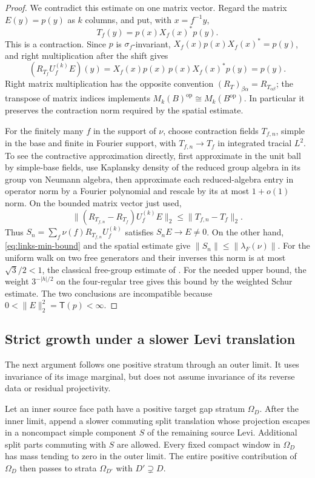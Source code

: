 \begin{proof}
We contradict this estimate on one matrix vector. Regard the matrix
\(E(y)=p(y)\) as \(k\) columns, and put, with \(x=f^{-1}y\),
\[
 T_f(y)=p(x)X_f(x)^*p(y).
\]
This is a contraction. Since \(p\) is \(\sigma_f\)-invariant,
\(X_f(x)p(x)X_f(x)^*=p(y)\), and right multiplication after the
shift gives
\[
 (R_{T_f}U_f^{(k)}E)(y)
   =X_f(x)p(x)\,p(x)X_f(x)^*p(y)=p(y).
\]
Right matrix multiplication has the opposite convention
\((R_T)_{\beta\alpha}=R_{T_{\alpha\beta}}\); the transpose of
matrix indices implements
\(M_k(B)^{\mathrm{op}}\cong M_k(B^{\mathrm{op}})\).
In particular it preserves the contraction norm required by the
spatial estimate.

For the finitely many \(f\) in the support of \(\nu\), choose
contraction fields \(T_{f,n}\), simple in the base and finite in
Fourier support, with \(T_{f,n}\to T_f\) in integrated tracial
\(L^2\). To see the contractive approximation directly, first
approximate in the unit ball by simple-base fields, use Kaplansky
density of the reduced group algebra in its group von Neumann algebra,
then approximate each reduced-algebra entry in operator norm by a
Fourier polynomial and rescale by its at most \(1+o(1)\) norm.
On the bounded matrix vector just used,
\[
 \|(R_{T_{f,n}}-R_{T_f})U_f^{(k)}E\|_2
       \leq\|T_{f,n}-T_f\|_2.
\]
Thus \(S_n=\sum_f\nu(f)R_{T_{f,n}}U_f^{(k)}\) satisfies
\(S_nE\to E\ne0\). On the other hand,
\eqref{eq:links-min-bound} and the spatial estimate give
\(\|S_n\|\leq\|\lambda_F(\nu)\|\).
For the uniform walk on two free generators and their inverses this
norm is at most \(\sqrt3/2<1\), the classical free-group estimate of \cite[Theorem~3]{Kesten1959}. For the needed upper bound, the weight
\(3^{-|h|/2}\) on the four-regular tree gives this bound by the
weighted Schur estimate. The two conclusions are incompatible because
\(0<\|E\|_2^2=\mathsf T(p)<\infty\).
\end{proof}

\subsection{Strict growth under a slower Levi translation}

The next argument follows one positive stratum through an outer
limit. It uses invariance of its image marginal, but does not
assume invariance of its reverse data or residual projectivity.

\begin{lemma}
\label{lem:links-strict-growth}
Let an inner source face path have a positive target gap stratum
\(\Omega_D\). After the inner limit, append a slower commuting
split translation whose projection escapes in a noncompact simple
component \(S\) of the remaining source Levi. Additional split
parts commuting with \(S\) are allowed. Every fixed compact
window in \(\Omega_D\) has mass tending to zero in the outer
limit. The entire positive contribution of \(\Omega_D\) then
passes to strata \(\Omega_{D'}\) with \(D'\supsetneq D\).
\end{lemma}

